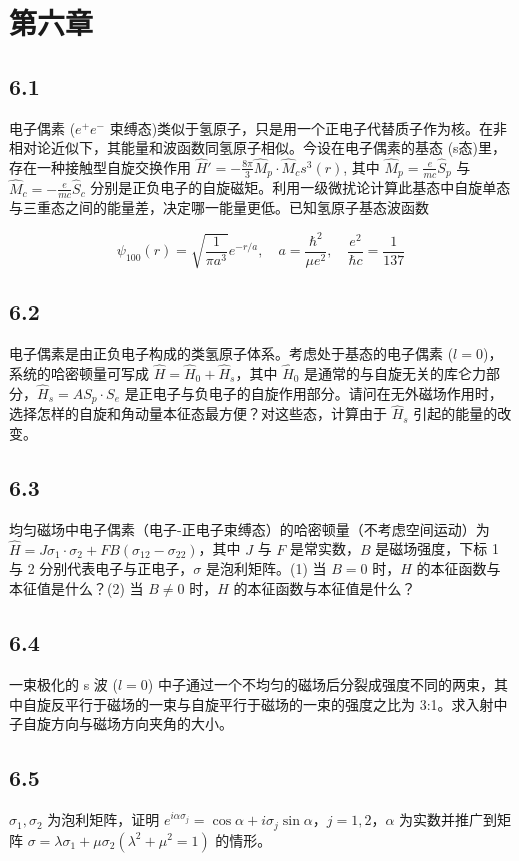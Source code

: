 \section{第六章}

\subsection{6.1}
电子偶素 ($e^+ e^-$ 束缚态)类似于氢原子，只是用一个正电子代替质子作为核。在非相对论近似下，其能量和波函数同氢原子相似。今设在电子偶素的基态 (s态)里，存在一种接触型自旋交换作用 $\hat{H}' = -\frac{8\pi}{3}\hat{M}_p \cdot \hat{M}_c s^3(r)$, 其中 $\hat{M}_p = \frac{e}{mc}\hat{S}_p$ 与 $\hat{M}_c = -\frac{e}{mc}\hat{S}_c$ 分别是正负电子的自旋磁矩。利用一级微扰论计算此基态中自旋单态与三重态之间的能量差，决定哪一能量更低。已知氢原子基态波函数

$$\psi_{100}(r) = \sqrt{\frac{1}{\pi a^3}} e^{-r/a}, \quad a = \frac{\hbar^2}{\mu e^2}, \quad \frac{e^2}{\hbar c} = \frac{1}{137}$$

\subsection{6.2}
电子偶素是由正负电子构成的类氢原子体系。考虑处于基态的电子偶素 ($l = 0$)，系统的哈密顿量可写成 $\hat{H} = \hat{H}_0 + \hat{H}_s$，其中 $\hat{H}_0$ 是通常的与自旋无关的库仑力部分，$\hat{H}_s = A S_p \cdot S_e$ 是正电子与负电子的自旋作用部分。请问在无外磁场作用时，选择怎样的自旋和角动量本征态最方便？对这些态，计算由于 $\hat{H}_s$ 引起的能量的改变。

\subsection{6.3}
均匀磁场中电子偶素（电子-正电子束缚态）的哈密顿量（不考虑空间运动）为 $\hat{H} = J \sigma_1 \cdot \sigma_2 + FB (\sigma_{12} - \sigma_{22})$，其中 $J$ 与 $F$ 是常实数，$B$ 是磁场强度，下标 1 与 2 分别代表电子与正电子，$\sigma$ 是泡利矩阵。(1) 当 $B = 0$ 时，$\hat{H}$ 的本征函数与本征值是什么？(2) 当 $B \neq 0$ 时，$\hat{H}$ 的本征函数与本征值是什么？

\subsection{6.4}
一束极化的 s 波 ($l = 0$) 中子通过一个不均匀的磁场后分裂成强度不同的两束，其中自旋反平行于磁场的一束与自旋平行于磁场的一束的强度之比为 3:1。求入射中子自旋方向与磁场方向夹角的大小。

\subsection{6.5}
$\sigma_1, \sigma_2$ 为泡利矩阵，证明 $e^{i\alpha\sigma_j} = \cos \alpha + i\sigma_j \sin \alpha$，$j = 1, 2$，$\alpha$ 为实数并推广到矩阵 $\sigma = \lambda \sigma_1 + \mu \sigma_2 (\lambda^2 + \mu^2 = 1)$ 的情形。

